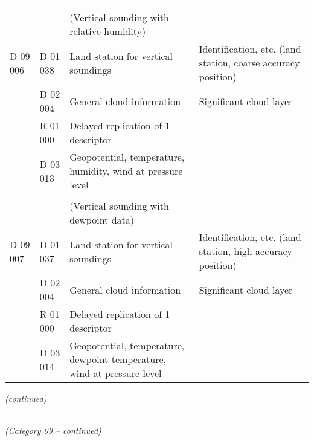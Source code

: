 \begin{longtable}[]{@{}llll@{}}
& & &\tabularnewline
& & (Vertical sounding with relative humidity) &\tabularnewline
D 09 006 & D 01 038 & Land station for vertical soundings & Identification, etc. (land station, coarse accuracy position)\tabularnewline
& D 02 004 & General cloud information & Significant cloud layer\tabularnewline
& R 01 000 & Delayed replication of 1 descriptor &\tabularnewline
& D 03 013 & Geopotential, temperature, humidity, wind at pressure level &\tabularnewline
& & &\tabularnewline
& & (Vertical sounding with dewpoint data) &\tabularnewline
D 09 007 & D 01 037 & Land station for vertical soundings & Identification, etc. (land station, high accuracy position)\tabularnewline
& D 02 004 & General cloud information & Significant cloud layer\tabularnewline
& R 01 000 & Delayed replication of 1 descriptor &\tabularnewline
& D 03 014 & Geopotential, temperature, dewpoint temperature, wind at pressure level &\tabularnewline
\bottomrule
\end{longtable}

\emph{(continued)}

\emph{\\
(Category 09 -- continued)}


